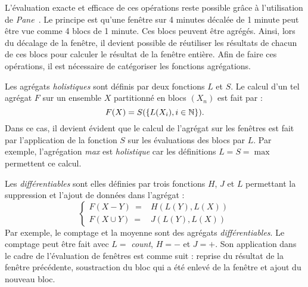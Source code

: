 L'évaluation exacte et efficace de ces opérations reste possible grâce à l'utilisation de \textit{Pane}~\cite{Li:pane}. Le principe est qu'une fenêtre sur 4 minutes décalée de 1 minute peut être vue comme 4 blocs de 1 minute. Ces blocs peuvent être agrégés. Ainsi, lors du décalage de la fenêtre, il devient possible de réutiliser les résultats de chacun de ces blocs pour calculer le résultat de la fenêtre entière. Afin de faire ces opérations, il est nécessaire de catégoriser les fonctions agrégations. 

Les agrégats \textit{holistiques} sont définis par deux fonctions $L$ et $S$. Le calcul d'un tel agrégat $F$ sur un ensemble $X$ partitionné en blocs $(X_n)$ est fait par : $$F(X) = S(\{L(X_i), i\in \mathbb{N}\}).$$ 
Dans ce cas, il devient évident que le calcul de l'agrégat sur les fenêtres est fait par l'application de la fonction $S$ sur les évaluations des blocs par $L$. Par exemple, l'agrégation \textit{max} est \textit{holistique} car les définitions $L=S=\max$ permettent ce calcul.

Les \textit{différentiables} sont elles définies par trois fonctions $H$, $J$ et $L$ permettant la suppression et l'ajout de données dans l'agrégat : $$\begin{cases} F(X-Y) \ =& H(L(Y), L(X)) \\ F(X\cup Y)\ =& J(L(Y), L(X))\end{cases}$$
Par exemple, le comptage et la moyenne sont des agrégats \textit{différentiables}. Le comptage peut être fait avec $L=$ \textit{count}, $H=-$ et $J=+$. Son application dans le cadre de l'évaluation de fenêtres est comme suit : reprise du résultat de la fenêtre précédente, soustraction du bloc qui a été enlevé de la fenêtre et ajout du nouveau bloc.
